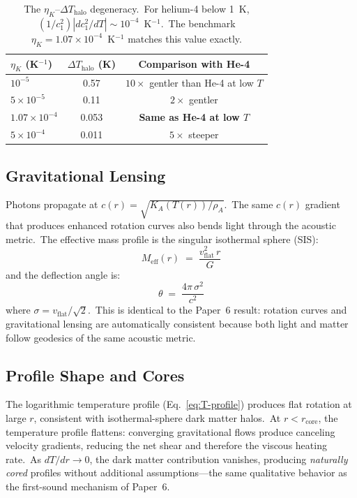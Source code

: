\documentclass[12pt,letterpaper]{article}
\newcommand{\rhoa}{\rho_{\!A}}
\newcommand{\Ka}{K_{\!A}}
\newcommand{\etaK}{\eta_{\!K}}
\begin{document}
\begin{table}[h]
\centering
\begin{tabular}{@{}lcc@{}}
\toprule
$\etaK$ (K$^{-1}$) & $\Delta T_{\mathrm{halo}}$ (K) &
  Comparison with He-4 \\
\midrule
$10^{-5}$        & 0.57     & $10\times$ gentler than He-4 at low $T$ \\
$5 \times 10^{-5}$ & 0.11   & $2\times$ gentler \\
$1.07 \times 10^{-4}$ & 0.053 & \textbf{Same as He-4 at low $T$} \\
$5 \times 10^{-4}$ & 0.011 & $5\times$ steeper \\
\bottomrule
\end{tabular}
\caption{The $\etaK$--$\Delta T_{\mathrm{halo}}$ degeneracy.\ For helium-4
  below 1~K, $(1/c_1^2)|dc_1^2/dT| \sim 10^{-4}$~K$^{-1}$.\ The benchmark
  $\etaK = 1.07 \times 10^{-4}$~K$^{-1}$ matches this value exactly.}
\label{tab:eta-DT}
\end{table}


\subsection{Gravitational Lensing}

Photons propagate at $c(r) = \sqrt{\Ka(T(r))/\rhoa}$.\ The same $c(r)$
gradient that produces enhanced rotation curves also bends light through the
acoustic metric.\ The effective mass profile is the singular isothermal
sphere (SIS):
%
\begin{equation}
  M_{\mathrm{eff}}(r) \;=\; \frac{v_{\mathrm{flat}}^2\,r}{G}
  \label{eq:Meff}
\end{equation}
%
and the deflection angle is:
%
\begin{equation}
  \theta \;=\; \frac{4\pi\,\sigma^2}{c^2}
  \label{eq:deflection}
\end{equation}
%
where $\sigma = v_{\mathrm{flat}}/\sqrt{2}$.\ This is identical to the
Paper~6 result: rotation curves and gravitational lensing are automatically
consistent because both light and matter follow geodesics of the same
acoustic metric.


\subsection{Profile Shape and Cores}

The logarithmic temperature profile (Eq.~\ref{eq:T-profile}) produces flat
rotation at large $r$, consistent with isothermal-sphere dark matter halos.\
At $r < r_{\mathrm{core}}$, the temperature profile flattens: converging
gravitational flows produce canceling velocity gradients, reducing the net
shear and therefore the viscous heating rate.\ As $dT/dr \to 0$, the dark
matter contribution vanishes, producing \emph{naturally cored} profiles
without additional assumptions---the same qualitative behavior as the
first-sound mechanism of Paper~6.
\end{document}
